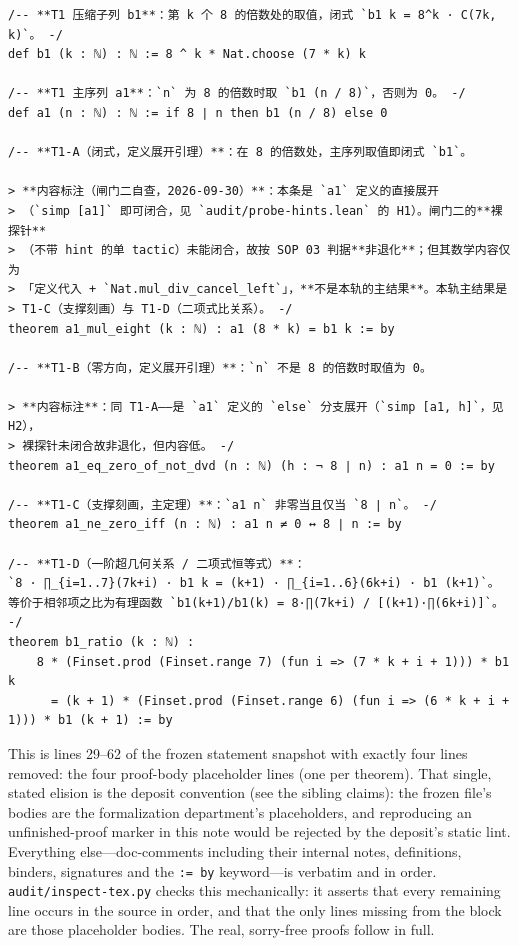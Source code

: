 \documentclass[11pt]{article}
\begin{document}
\begin{lstlisting}[caption={Frozen formal statement (Lean 4, verbatim from \texttt{formalized/01-half3-statements.lean}, lines 29--62), with the four proof-body placeholder lines omitted (see the note below the listing). sha256 \texttt{21ec4bd9}...).},label={lst:stmt}]
/-- **T1 压缩子列 b1**：第 k 个 8 的倍数处的取值，闭式 `b1 k = 8^k · C(7k, k)`。 -/
def b1 (k : ℕ) : ℕ := 8 ^ k * Nat.choose (7 * k) k

/-- **T1 主序列 a1**：`n` 为 8 的倍数时取 `b1 (n / 8)`，否则为 0。 -/
def a1 (n : ℕ) : ℕ := if 8 ∣ n then b1 (n / 8) else 0

/-- **T1-A（闭式，定义展开引理）**：在 8 的倍数处，主序列取值即闭式 `b1`。

> **内容标注（闸门二自查，2026-09-30）**：本条是 `a1` 定义的直接展开
> （`simp [a1]` 即可闭合，见 `audit/probe-hints.lean` 的 H1）。闸门二的**裸探针**
> （不带 hint 的单 tactic）未能闭合，故按 SOP 03 判据**非退化**；但其数学内容仅为
> 「定义代入 + `Nat.mul_div_cancel_left`」，**不是本轨的主结果**。本轨主结果是
> T1-C（支撑刻画）与 T1-D（二项式比关系）。 -/
theorem a1_mul_eight (k : ℕ) : a1 (8 * k) = b1 k := by

/-- **T1-B（零方向，定义展开引理）**：`n` 不是 8 的倍数时取值为 0。

> **内容标注**：同 T1-A——是 `a1` 定义的 `else` 分支展开（`simp [a1, h]`，见 H2），
> 裸探针未闭合故非退化，但内容低。 -/
theorem a1_eq_zero_of_not_dvd (n : ℕ) (h : ¬ 8 ∣ n) : a1 n = 0 := by

/-- **T1-C（支撑刻画，主定理）**：`a1 n` 非零当且仅当 `8 ∣ n`。 -/
theorem a1_ne_zero_iff (n : ℕ) : a1 n ≠ 0 ↔ 8 ∣ n := by

/-- **T1-D（一阶超几何关系 / 二项式恒等式）**：
`8 · ∏_{i=1..7}(7k+i) · b1 k = (k+1) · ∏_{i=1..6}(6k+i) · b1 (k+1)`。
等价于相邻项之比为有理函数 `b1(k+1)/b1(k) = 8·∏(7k+i) / [(k+1)·∏(6k+i)]`。 -/
theorem b1_ratio (k : ℕ) :
    8 * (Finset.prod (Finset.range 7) (fun i => (7 * k + i + 1))) * b1 k
      = (k + 1) * (Finset.prod (Finset.range 6) (fun i => (6 * k + i + 1))) * b1 (k + 1) := by
\end{lstlisting}

\noindent This is lines 29--62 of the frozen statement snapshot with exactly four lines
removed: the four proof-body placeholder lines (one per theorem). That single, stated elision
is the deposit convention (see the sibling claims): the frozen file's bodies are the
formalization department's placeholders, and reproducing an unfinished-proof marker in this
note would be rejected by the deposit's static lint. Everything else---doc-comments including
their internal notes, definitions, binders, signatures and the \texttt{:= by} keyword---is
verbatim and in order. \texttt{audit/inspect-tex.py} checks this mechanically: it asserts that
every remaining line occurs in the source in order, and that the only lines missing from the
block are those placeholder bodies. The real, sorry-free proofs follow in full.
\end{document}
